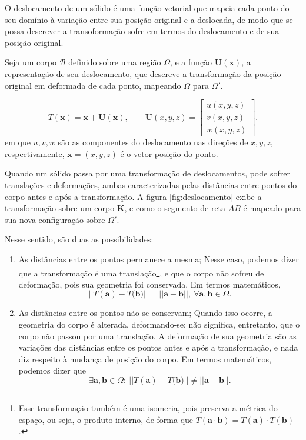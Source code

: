 O deslocamento de um sólido é uma função vetorial que mapeia cada ponto do seu domínio à variação entre sua posição original e a deslocada, de modo que se possa descrever a transoformação sofre em termos do deslocamento e de sua posição original. 

Seja um corpo $\mathcal{B}$ definido sobre uma região $\Omega$, e a função $\bm{U}(\bm{x})$, a representação de seu deslocamento, que descreve a transformação da posição original em deformada de cada ponto, mapeando $\Omega$ para $\Omega'$.

\begin{equation}
    T(\bm{x}) = \bm{x} + \bm{U}(\bm{x}), \qquad
    \bm{U}(x,y,z) = \begin{bmatrix}
        u(x,y,z) \\ v(x,y,z) \\ w(x,y,z) 
    \end{bmatrix}.
    \label{eq:transformacao}
\end{equation}
em que $u, v, w$ são as componentes do deslocamento nas direções de $x, y, z$, respectivamente,  $\bm{x} = (x,y,z)$ é o vetor posição do ponto.



Quando um sólido passa por uma transformação de deslocamentos, pode sofrer translações e deformações, ambas caracterizadas pelas distâncias entre pontos do corpo antes e após a transformação. A figura \ref{fig:deslocamento} exibe a transformação sobre um corpo $\bm{K}$, e como o segmento de reta $AB$ é mapeado para sua nova configuração sobre $\Omega'$.

Nesse sentido, são duas as possibilidades:
\begin{enumerate}
    \item As distâncias entre os pontos permanece a mesma;
        Nesse caso, podemos dizer que a transformação é uma translação\footnote{Esse transformação também é uma isomeria, pois preserva a métrica do espaço, ou seja, o produto interno, de forma que $ T(\bm{a} \cdot \bm{b}) = T(\bm{a}) \cdot T(\bm{b}) $.}, e que o corpo não sofreu de deformação, pois sua geometria foi conservada. Em termos matemáticos,
        \begin{equation}
            ||{T(\bm{a}) - T(\bm{b}})|| = ||{\bm{a} - \bm{b}}||, \ \forall \bm{a}, \bm{b} \in \Omega. 
        \end{equation}        
    \item As distâncias entre os pontos não se conservam;
        Quando isso ocorre, a geometria do corpo é alterada, deformando-se; não significa, entretanto, que o corpo não passou por uma translação. A deformação de sua geometria são as variações das distâncias entre os pontos antes e após a transformação, e nada diz respeito à mudança de posição do corpo. Em termos matemáticos, podemos dizer que
        \begin{equation}
             \exists \bm{a}, \bm{b} \in \Omega : \ ||{T(\bm{a}) - T(\bm{b}})|| \neq ||{\bm{a} - \bm{b}}||.
        \end{equation}
\end{enumerate}


